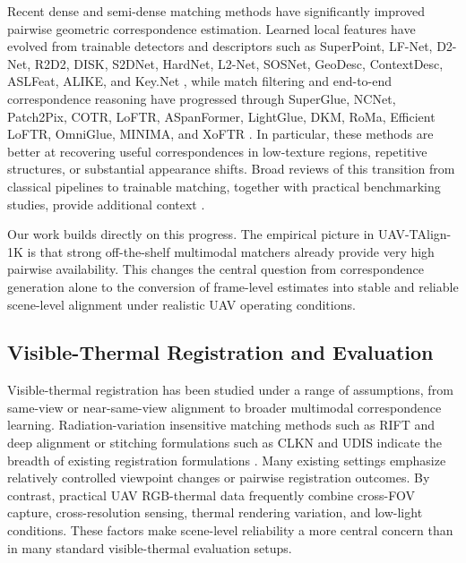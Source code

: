 Recent dense and semi-dense matching methods have significantly improved pairwise geometric
correspondence estimation. Learned local features have evolved from trainable detectors and
descriptors such as SuperPoint, LF-Net, D2-Net, R2D2, DISK, S2DNet, HardNet, L2-Net, SOSNet,
GeoDesc, ContextDesc, ASLFeat, ALIKE, and Key.Net
\cite{detone2018superpoint,ono2018lfnet,dusmanu2019d2net,revaud2019r2d2,tyszkiewicz2020disk,germain2020s2dnet,mishchuk2017hardnet,tian2017l2net,tian2019sosnet,luo2018geodesc,luo2019contextdesc,luo2020aslfeat,zhao2023alike,barroso2019keynet},
while match filtering and end-to-end correspondence reasoning have progressed through
SuperGlue, NCNet, Patch2Pix, COTR, LoFTR, ASpanFormer, LightGlue, DKM, RoMa, Efficient LoFTR,
OmniGlue, MINIMA, and XoFTR
\cite{sarlin2020superglue,rocco2018ncnet,zhou2021patch2pix,jiang2021cotr,sun2021loftr,chen2022aspanformer,lindenberger2023lightglue,edstedt2023dkm,edstedt2024roma,wang2024efficientloftr,jiang2024omniglue,ren2025minima,tuzcuoglu2024xoftr}.
In particular, these methods are better at recovering useful correspondences in low-texture
regions, repetitive structures, or substantial appearance shifts. Broad reviews of this transition
from classical pipelines to trainable matching, together with practical benchmarking studies,
provide additional context
\cite{ma2021survey,liao2024survey}.

Our work builds directly on this progress. The empirical picture in UAV-TAlign-1K is that strong
off-the-shelf multimodal matchers already provide very high pairwise availability. This changes the
central question from correspondence generation alone to the conversion of frame-level estimates
into stable and reliable scene-level alignment under realistic UAV operating conditions.

\subsection{Visible-Thermal Registration and Evaluation}

Visible-thermal registration has been studied under a range of assumptions, from same-view or
near-same-view alignment to broader multimodal correspondence learning. Radiation-variation
insensitive matching methods such as RIFT and deep alignment or stitching formulations such as
CLKN and UDIS indicate the breadth of existing registration formulations
\cite{li2020rift,chang2017clkn,nie2021udis}. Many existing settings emphasize relatively
controlled viewpoint changes or pairwise registration outcomes. By contrast, practical UAV
RGB-thermal data frequently combine cross-FOV capture, cross-resolution sensing, thermal rendering
variation, and low-light conditions.
These factors make scene-level reliability a more central concern than in many standard
visible-thermal evaluation setups.

